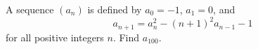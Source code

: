 A sequence $(a_n)$ is defined by $a_0 = -1$, $a_1 = 0$, and
$$ a_{n+1} = a_n^2 - (n+1)^2 a_{n-1} - 1 $$
for all positive integers $n$. Find $a_{100}$.
